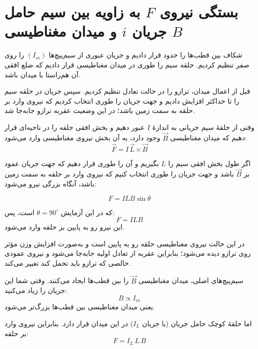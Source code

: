 \documentclass[a4paper, 11pt]{article}
\begin{document}
\section{بستگی نیروی $F$ به زاویه بین سیم حامل جریان $i$ و میدان مغناطیسی $B$}

 شکاف بین قطب‌ها را حدود  قرار دادیم و جریان عبوری از سیم‌پیچ‌ها $(I_m)$ را روی صفر 
تنظیم کردیم. حلقه سیم  را طوری در میدان مغناطیسی قرار دادیم که ضلع افقی آن هم‌راستا با میدان باشد. 

قبل از اعمال میدان، ترازو را در حالت تعادل تنظیم کردیم. سپس جریان در حلقه سیم را تا حداکثر  افزایش دادیم و جهت جریان را طوری انتخاب کردیم که نیروی وارد بر حلقه به سمت زمین باشد؛ در این وضعیت عقربه ترازو جابه‌جا شد.

وقتی از حلقهٔ سیم جریانی به اندازهٔ 
$I$
 عبور دهیم و بخش افقی حلقه را در ناحیه‌ای قرار دهیم که میدان مغناطیسی 
$\vec{B}$
 وجود دارد، به آن بخش نیروی مغناطیسی وارد می‌شود:
\begin{equation}
\vec F = I \, \vec L \times \vec B
\end{equation}

اگر طول بخش افقی سیم را $L$ بگیریم و آن را طوری قرار دهیم که جهت جریان عمود بر $\vec B$ باشد و جهت جریان را طوری انتخاب کنیم که نیروی وارد بر حلقه به سمت زمین باشد، آنگاه بزرگی نیرو می‌شود:

\begin{equation}
F = I L B \sin\theta
\label{eq1}
\end{equation}

که در این آزمایش $\theta = 90^\circ$ است، پس:
\begin{equation}
F = I L B
\end{equation}
این نیرو رو به پایین بر حلقه وارد می‌شود.

در این حالت نیروی مغناطیسی حلقه رو به پایین است و به‌صورت افزایش وزن مؤثر روی ترازو دیده می‌شود؛ بنابراین عقربه از تعادل اولیه جابه‌جا می‌شود و نیروی عمودی خالصی که ترازو باید تحمل کند تغییر می‌کند.

سیم‌پیچ‌های اصلی، میدان مغناطیسی $\vec B$ را بین قطب‌ها ایجاد می‌کنند. وقتی شما این جریان را زیاد می‌کنید:
\begin{equation}
B \propto I_m
\end{equation}
یعنی میدان مغناطیسی بین قطب‌ها بزرگ‌تر می‌شود.

اما حلقهٔ کوچک حامل جریان (با جریان $I_L$) در این میدان قرار دارد. بنابراین نیروی وارد بر حلقه:
\begin{equation}
F = I_L \, L \, B
\end{equation}
\end{document}
